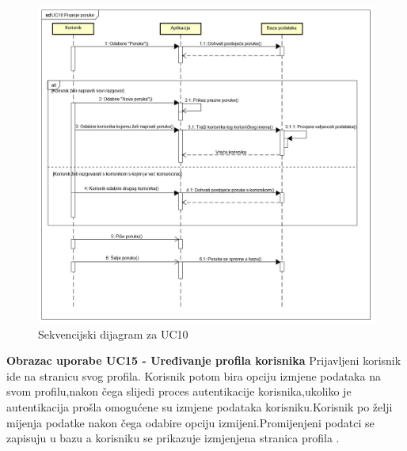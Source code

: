 				\begin{figure}[H]
					\begin{center}
						\includegraphics[width=15cm]{slike/UC10.PNG}
					\end{center}
					\caption{Sekvencijski dijagram za UC10}
					\label{fig:uc10}
				\end{figure}
				
				\eject
				 \textbf{Obrazac uporabe UC15 - Uređivanje profila korisnika}
			\newline
			{Prijavljeni korisnik ide na stranicu svog profila.
			Korisnik potom bira opciju izmjene podataka na svom profilu,nakon čega slijedi proces autentikacije korisnika,ukoliko je autentikacija prošla omogućene su izmjene podataka korisniku.Korisnik po želji mijenja podatke nakon čega odabire opciju izmijeni.Promijenjeni podatci se zapisuju u bazu a korisniku se prikazuje izmjenjena stranica profila .}\\
				

